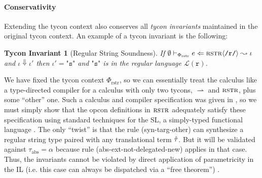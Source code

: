 \documentclass[pldi]{sigplanconf-pldi15}
\newtheorem{theorem}{Theorem}
\newtheorem{tyconinvariant}{Tycon Invariant}
\newenvironment{proof-sketch}{\noindent{\emph{Proof Sketch.}}}{\qed}
\begin{document}

\paragraph{Conservativity} 
Extending the tycon context also conserves all \emph{tycon invariants} maintained in the original tycon context. An example of a tycon invariant is the following:

\begin{tyconinvariant}[Regular String Soundness]
If $\emptyset \vdash_{\Phi_\text{rstr}} e \Leftarrow {\textsc{rstr}}\langle\texttt{/r/}\rangle \leadsto \iota$ and $\iota \Downarrow \iota'$ then $\iota'=\texttt{"s"}$ and $\texttt{"s"}$ is in the regular language $\mathcal{L}(\texttt{r})$.
\end{tyconinvariant}
\begin{proof-sketch} We have fixed the tycon context $\Phi_\text{rstr}$, so we can essentially treat the calculus like a type-directed compiler for a calculus with only two tycons, $\rightharpoonup$ and $\textsc{rstr}$, plus some ``other'' one. Such a calculus and compiler specification was given in \cite{sanitation-psp14}, so we must simply show that the opcon definitions in $\textsc{rstr}$ adequately satisfy these specification using standard techniques for the SL, a simply-typed functional language \cite{conf/pldi/Chlipala07}. The only ``twist'' is that the rule (syn-targ-other) can synthesize a regular string type paired with any translational term $\hat{\tau}$. But it will be validated against $\tau_\text{abs}=\alpha$ because rule (abs-ext-not-delegated-new) applies in that case.  Thus, the invariants cannot be violated by direct application of parametricity in the IL (i.e. this case can always be dispatched via a ``free theorem'') \cite{WadlerThms}. \end{proof-sketch}
\end{document}
